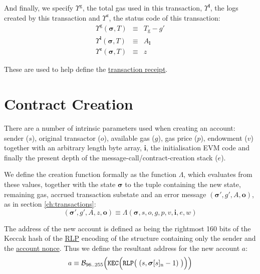 \documentclass[9pt,oneside]{amsart}
\begin{document}
\begin{multicols}{2}
\hypertarget{tx_total_gas_used_Upsilon_pow_g}{}\hypertarget{tx_logs_Upsilon_pow_l}{}\hypertarget{tx_status_Upsilon_pow_z}{}And finally, we specify $\Upsilon^{\mathrm{g}}$, the total gas used in this transaction, $\Upsilon^\mathbf{l}$, the logs created by this transaction and $\Upsilon^{\mathrm{z}}$, the status code of this transaction:
\begin{eqnarray}
\Upsilon^{\mathrm{g}}(\boldsymbol{\sigma}, T) & \equiv & T_{\mathrm{g}} - g' \\
\Upsilon^\mathbf{l}(\boldsymbol{\sigma}, T) & \equiv & A_{\mathbf{l}} \\
\Upsilon^{\mathrm{z}}(\boldsymbol{\sigma}, T) & \equiv & z
\end{eqnarray}

These are used to help define the \hyperlink{Transaction_Receipt}{transaction receipt}.

\section{Contract Creation}\label{ch:create}\hypertarget{endow}{}

There are a number of intrinsic parameters used when creating an account: sender ($s$), original transactor ($o$), available gas ($g$), gas price ($p$), endowment ($v$) together with an arbitrary length byte array, $\mathbf{i}$, the initialisation EVM code and finally the present depth of the message-call/contract-creation stack ($e$).

We define the creation function formally as the function $\Lambda$, which evaluates from these values, together with the state $\boldsymbol{\sigma}$ to the tuple containing the new state, remaining gas, accrued transaction substate and an error message $(\boldsymbol{\sigma}', g', A, \mathbf{o})$, as in section \ref{ch:transactions}:
\begin{equation}
(\boldsymbol{\sigma}', g', A, z, \mathbf{o}) \equiv \Lambda(\boldsymbol{\sigma}, s, o, g, p, v, \mathbf{i}, e, w)
\end{equation}

The address of the new account is defined as being the rightmost 160 bits of the Keccak hash of the \hyperlink{rlp}{RLP} encoding of the structure containing only the sender and the \hyperlink{account nonce}{account nonce}. Thus we define the resultant address for the new account $a$:
\begin{equation}
a \equiv \mathcal{B}_{96..255}\Big(\mathtt{\tiny KEC}\Big(\mathtt{\tiny RLP}\big(\;(s, \boldsymbol{\sigma}[s]_{\mathrm{n}} - 1)\;\big)\Big)\Big)
\end{equation}


\end{multicols}
\end{document}
